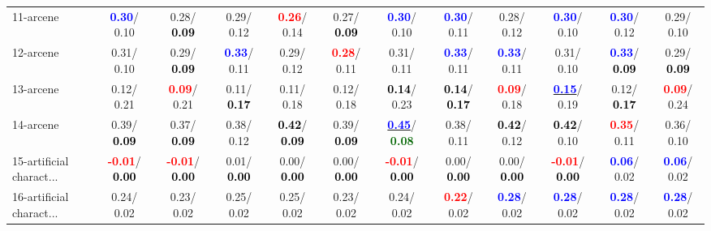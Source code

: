 \begin{table}[h]
\begin{center}
{\begin{tabular}{lc|c|c|c|c|c|c|c|c|c|c}
11-arcene & \textcolor{blue}{\textbf{  0.30}}/  0.10 &   0.28/\textcolor{black}{\textbf{  0.09}} &   0.29/  0.12 & \textcolor{red}{\textbf{  0.26}}/  0.14 &   0.27/\textcolor{black}{\textbf{  0.09}} & \textcolor{blue}{\textbf{  0.30}}/  0.10 & \textcolor{blue}{\textbf{  0.30}}/  0.11 &   0.28/  0.12 & \textcolor{blue}{\textbf{  0.30}}/  0.10 & \textcolor{blue}{\textbf{  0.30}}/  0.12 &   0.29/  0.10 \\
12-arcene &   0.31/  0.10 &   0.29/\textcolor{black}{\textbf{  0.09}} & \textcolor{blue}{\textbf{  0.33}}/  0.11 &   0.29/  0.12 & \textcolor{red}{\textbf{  0.28}}/  0.11 &   0.31/  0.11 & \textcolor{blue}{\textbf{  0.33}}/  0.11 & \textcolor{blue}{\textbf{  0.33}}/  0.11 &   0.31/  0.10 & \textcolor{blue}{\textbf{  0.33}}/\textcolor{black}{\textbf{  0.09}} &   0.29/\textcolor{black}{\textbf{  0.09}} \\
13-arcene &   0.12/  0.21 & \textcolor{red}{\textbf{  0.09}}/  0.21 &   0.11/\textcolor{black}{\textbf{  0.17}} &   0.11/  0.18 &   0.12/  0.18 & \textcolor{black}{\textbf{  0.14}}/  0.23 & \textcolor{black}{\textbf{  0.14}}/\textcolor{black}{\textbf{  0.17}} & \textcolor{red}{\textbf{  0.09}}/  0.18 & \underline{\textcolor{blue}{\textbf{  0.15}}}/  0.19 &   0.12/\textcolor{black}{\textbf{  0.17}} & \textcolor{red}{\textbf{  0.09}}/  0.24 \\
14-arcene &   0.39/\textcolor{black}{\textbf{  0.09}} &   0.37/\textcolor{black}{\textbf{  0.09}} &   0.38/  0.12 & \textcolor{black}{\textbf{  0.42}}/\textcolor{black}{\textbf{  0.09}} &   0.39/\textcolor{black}{\textbf{  0.09}} & \underline{\textcolor{blue}{\textbf{  0.45}}}/\textcolor{darkgreen}{\textbf{  0.08}} &   0.38/  0.11 & \textcolor{black}{\textbf{  0.42}}/  0.12 & \textcolor{black}{\textbf{  0.42}}/  0.10 & \textcolor{red}{\textbf{  0.35}}/  0.11 &   0.36/  0.10 \\ \hline
15-artificial charact... & \textcolor{red}{\textbf{ -0.01}}/\textcolor{black}{\textbf{  0.00}} & \textcolor{red}{\textbf{ -0.01}}/\textcolor{black}{\textbf{  0.00}} &   0.01/\textcolor{black}{\textbf{  0.00}} &   0.00/\textcolor{black}{\textbf{  0.00}} &   0.00/\textcolor{black}{\textbf{  0.00}} & \textcolor{red}{\textbf{ -0.01}}/\textcolor{black}{\textbf{  0.00}} &   0.00/\textcolor{black}{\textbf{  0.00}} &   0.00/\textcolor{black}{\textbf{  0.00}} & \textcolor{red}{\textbf{ -0.01}}/\textcolor{black}{\textbf{  0.00}} & \textcolor{blue}{\textbf{  0.06}}/  0.02 & \textcolor{blue}{\textbf{  0.06}}/  0.02 \\
16-artificial charact... &   0.24/  0.02 &   0.23/  0.02 &   0.25/  0.02 &   0.25/  0.02 &   0.23/  0.02 &   0.24/  0.02 & \textcolor{red}{\textbf{  0.22}}/  0.02 & \textcolor{blue}{\textbf{  0.28}}/  0.02 & \textcolor{blue}{\textbf{  0.28}}/  0.02 & \textcolor{blue}{\textbf{  0.28}}/  0.02 & \textcolor{blue}{\textbf{  0.28}}/  0.02 \\

\end{tabular}}
\end{center}
\end{table}
